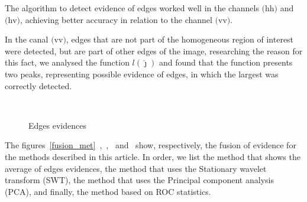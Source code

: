 \documentclass[conference]{IEEEtran}
\begin{document}
The algorithm to detect evidence of edges worked well in the channels $\text{(hh)}$ and $\text{(hv)}$, achieving better accuracy in relation to the channel $\text{(vv)}$.  

In the canal $\text{(vv)}$, edges that are not part of the homogeneous region of interest were detected, but are part of other edges of the image, researching the reason for this fact, we analysed the function $l(\widehat\jmath)$ and found that the function presents two peaks, representing possible evidence of edges, in which the largest was correctly detected. 
   \begin{figure}[!ht]
     \hfill
     \\
     \centering
     \caption{Edges evidences}
     \label{evidencias_hh_hv_vv}
   \end{figure}

The figures~\ref{fusion_met}~,~,~ and~ show, respectively, the fusion of evidence for the methods described in this article. In order, we list the method that shows the average of edges evidences, the method that uses the Stationary wavelet transform (SWT), the method that uses the Principal component analysis (PCA), and finally, the method based on ROC statistics.
\end{document}
